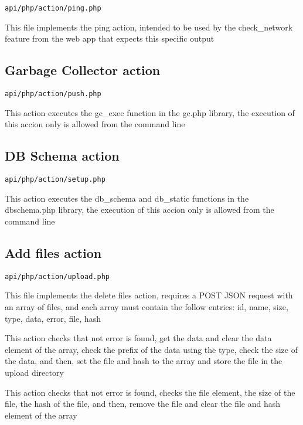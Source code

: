 \documentclass[a4paper]{article}
\begin{document}
\begin{lstlisting}
api/php/action/ping.php
\end{lstlisting}

This file implements the ping action, intended to be used by the check\_network
feature from the web app that expects this specific output

\hypertarget{toc11}{}
\subsection{Garbage Collector action}

\begin{lstlisting}
api/php/action/push.php
\end{lstlisting}

This action executes the gc\_exec function in the gc.php library, the execution
of this accion only is allowed from the command line

\hypertarget{toc12}{}
\subsection{DB Schema action}

\begin{lstlisting}
api/php/action/setup.php
\end{lstlisting}

This action executes the db\_schema and db\_static functions in the dbschema.php
library, the execution of this accion only is allowed from the command line

\hypertarget{toc13}{}
\subsection{Add files action}

\begin{lstlisting}
api/php/action/upload.php
\end{lstlisting}

This file implements the delete files action, requires a POST JSON request
with an array of files, and each array must contain the follow entries:
id, name, size, type, data, error, file, hash

This action checks that not error is found, get the data and clear the
data element of the array, check the prefix of the data using the type,
check the size of the data, and then, set the file and hash to the
array and store the file in the upload directory

This action checks that not error is found, checks the file element, the
size of the file, the hash of the file, and then, remove the file and
clear the file and hash element of the array
\end{document}
